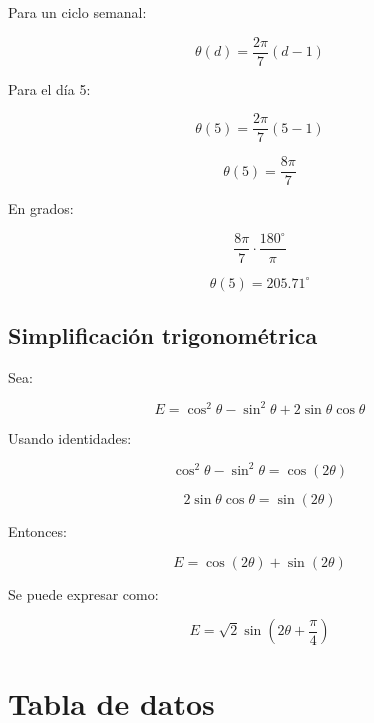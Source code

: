 \documentclass[12pt,a4paper]{article}
\begin{document}
	Para un ciclo semanal:
	
	\[
	\theta(d)=\frac{2\pi}{7}(d-1)
	\]
	
	Para el día 5:
	
	\[
	\theta(5)=\frac{2\pi}{7}(5-1)
	\]
	
	\[
	\theta(5)=\frac{8\pi}{7}
	\]
	
	En grados:
	
	\[
	\frac{8\pi}{7}\cdot\frac{180^\circ}{\pi}
	\]
	
	\[
	\theta(5)=205.71^\circ
	\]
	
	\subsection{Simplificación trigonométrica}
	
	Sea:
	
	\[
	E=\cos^2\theta-\sin^2\theta+2\sin\theta\cos\theta
	\]
	
	Usando identidades:
	
	\[
	\cos^2\theta-\sin^2\theta=\cos(2\theta)
	\]
	
	\[
	2\sin\theta\cos\theta=\sin(2\theta)
	\]
	
	Entonces:
	
	\[
	E=\cos(2\theta)+\sin(2\theta)
	\]
	
	Se puede expresar como:
	
	\[
	E=\sqrt{2}\sin\left(2\theta+\frac{\pi}{4}\right)
	\]
	
	\section{Tabla de datos}
	
\end{document}
